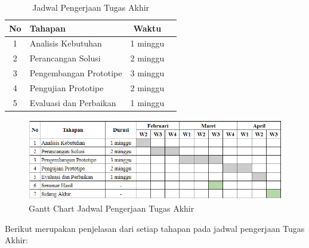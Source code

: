 \begin{table}[h]
	\caption{Jadwal Pengerjaan Tugas Akhir}
	\vspace{0.25cm}
	\begin{center}
		\begin{tabular}{|c|l|c|l|}
			\hline
			\textbf{No} & \textbf{Tahapan}       & \textbf{Waktu} \\ \hline
			1           & Analisis Kebutuhan     & 1 minggu       \\ \hline
			2           & Perancangan Solusi     & 2 minggu       \\ \hline
			3           & Pengembangan Prototipe & 3 minggu       \\ \hline
			4           & Pengujian Prototipe    & 2 minggu       \\ \hline
			5           & Evaluasi dan Perbaikan & 1 minggu       \\ \hline
		\end{tabular}
	\end{center}
\end{table}

\begin{figure}[ht]
	\centering
	\includegraphics[width=1\textwidth]{resources/chapter-4/gantt-chart.png}
	\caption{Gantt Chart Jadwal Pengerjaan Tugas Akhir}
	\label{image:gantt-chart}
\end{figure}

Berikut merupakan penjelasan dari setiap tahapan pada jadwal pengerjaan Tugas Akhir:

